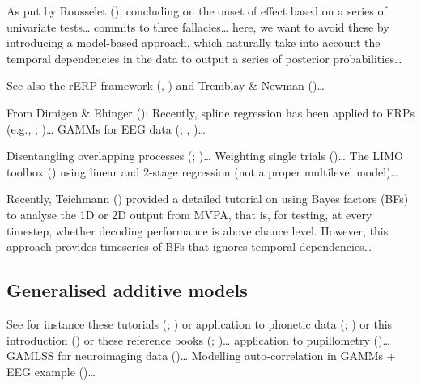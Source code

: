 \documentclass[
  man,
  floatsintext,
  longtable,
  a4paper,
  nolmodern,
  notxfonts,
  notimes,
  colorlinks=true,linkcolor=blue,citecolor=blue,urlcolor=blue]{apa7}
\begin{document}
As put by Rousselet (),
concluding on the onset of effect based on a series of univariate
tests\ldots{} commits to three fallacies\ldots{} here, we want to avoid
these by introducing a model-based approach, which naturally take into
account the temporal dependencies in the data to output a series of
posterior probabilities\ldots{}

See also the rERP framework (, ) and Tremblay \& Newman
()\ldots{}

From Dimigen \& Ehinger (): Recently,
spline regression has been applied to ERPs (e.g.,
;
)\ldots{} GAMMs
for EEG data (;
,
)\ldots{}

Disentangling overlapping processes
(;
)\ldots{}
Weighting single trials ()\ldots{} The LIMO toolbox () using linear and 2-stage regression (not a proper multilevel
model)\ldots{}

Recently, Teichmann () provided a
detailed tutorial on using Bayes factors (BFs) to analyse the 1D or 2D
output from MVPA, that is, for testing, at every timestep, whether
decoding performance is above chance level. However, this approach
provides timeseries of BFs that ignores temporal dependencies\ldots{}

\subsection{Generalised additive
models}\label{generalised-additive-models}

See for instance these tutorials
(;
) or application to
phonetic data (;
) or this introduction
() or these reference
books (;
)\ldots{} application to
pupillometry ()\ldots{}
GAMLSS for neuroimaging data ()\ldots{} Modelling auto-correlation in GAMMs + EEG example
()\ldots{}
\end{document}
